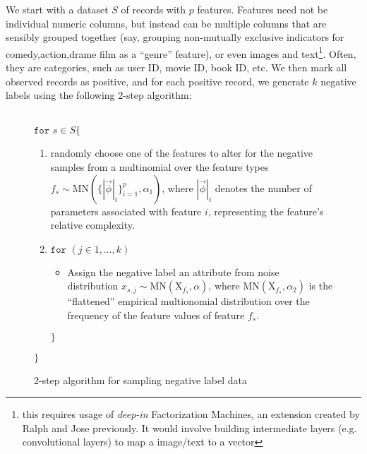 \documentclass{article} %
\begin{document}
We start with a dataset $S$ of records with $p$ features. Features need not be individual numeric columns, but instead can be multiple columns that are sensibly grouped together (say, grouping non-mutually exclusive indicators for comedy,action,drame film as a ``genre'' feature), or even images and text\footnote{this requires usage of \textit{deep-in} Factorization Machines, an extension created by Ralph and Jose previously. It would involve building intermediate layers (e.g. convolutional layers) to map a image/text to a vector}. Often, they are categories, such as user ID, movie ID, book ID, etc. We then mark all observed records as positive, and for each positive record, we generate $k$ negative labels using the following 2-step algorithm:
\\ \\
\begin{figure}
\begin{tcolorbox}
\noindent$\texttt{for }  s \in S \{$
\begin{enumerate}
	\item randomly choose  one of the features to alter for the negative samples from a multinomial over the feature types
	$ f_s \sim \text{MN}(\{|\vec{\phi}|_i\}_{i=1}^p,\alpha_1) $, where $|\vec{\phi}|_i$ denotes the number of parameters associated with feature $i$, representing the feature's relative complexity.
	\item $\texttt{for } (j \in 1,\ldots,k)$
	\begin{itemize}
		\item Assign the negative label an attribute from noise distribution $x_{s,j} \sim \text{MN}(\mathrm{X}_{f_s},\alpha)$, where $\text{MN}(\mathrm{X}_{f_s},\alpha_2)$ is the ``flattened'' empirical multionomial distribution over the frequency of the feature values of feature $f_s$.
	\end{itemize}
	$\}$
\end{enumerate}
$\}$
\end{tcolorbox}
\caption{2-step algorithm for sampling negative label data}
\end{figure}
\end{document}
